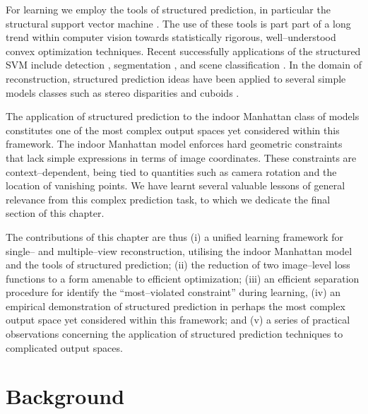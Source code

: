 For learning we employ the tools of structured prediction, in
particular the structural support vector machine
\cite{Tsochantaridis04}. The use of these tools is part part of a long
trend within computer vision towards statistically rigorous,
well--understood convex optimization techniques. Recent successfully
applications of the structured SVM include detection
\cite{blaschko2008learning}, segmentation \cite{taskar2004max}, and
scene classification \cite{Yang2010}. In the domain of reconstruction,
structured prediction ideas have been applied to several simple models
classes such as stereo disparities \cite{li2008learning} and cuboids
\cite{Hedau09}.

The application of structured prediction to the indoor Manhattan class
of models constitutes one of the most complex output spaces yet
considered within this framework. The indoor Manhattan model enforces
hard geometric constraints that lack simple expressions in terms of
image coordinates. These constraints are context--dependent, being
tied to quantities such as camera rotation and the location of
vanishing points. We have learnt several valuable lessons of general
relevance from this complex prediction task, to which we dedicate the
final section of this chapter.

The contributions of this chapter are thus (i) a unified learning
framework for single-- and multiple--view reconstruction, utilising
the indoor Manhattan model and the tools of structured prediction;
(ii) the reduction of two image--level loss functions to a form
amenable to efficient optimization; (iii) an efficient separation
procedure for identify the ``most--violated constraint'' during
learning, (iv) an empirical demonstration of structured prediction in
perhaps the most complex output space yet considered within this
framework; and (v) a series of practical observations concerning the
application of structured prediction techniques to complicated output
spaces.


\section{Background}
\label{sec:background}

